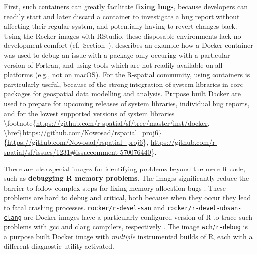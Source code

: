 First, such containers can greatly facilitate \textbf{fixing bugs},
because developers can readily start and later discard a container to
investigate a bug report without affecting their regular system, and
potentially having to revert changes back. Using the Rocker images with
RStudio, these disposable environments lack no development comfort
(cf.~Section~). \citet{eddelbuettel_debugging_2019}
describes an example how a Docker container was used to debug an issue
with a package only occuring with a particular version of Fortran, and
using tools which are not readily available on all platforms (e.g., not
on macOS). For the \href{https://www.r-spatial.org/}{R-spatial
community}, using containers is particularly useful, because of the
strong integration of system libraries in core packages for geospatial
data modelling and analysis. Purpose built Docker are used to prepare
for upcoming releases of system libraries, individual bug reports, and
for the lowest supported versions of system libraries
\textbackslash{}footnote\{\href{https://github.com/r-spatial/sf/tree/master/inst/docker}{https://github.com/r-spatial/sf/tree/master/inst/docker},
\textbackslash{}href\{\url{https://github.com/Nowosad/rspatial_proj6}\}\{\url{https://github.com/Nowosad/rspatial_proj6}\},
\href{https://github.com/r-spatial/sf/issues/1231#issuecomment-570076440}{https://github.com/r-spatial/sf/issues/1231\#issuecomment-570076440}\}.

There are also special images for identifying problems beyond the mere R
code, such as \textbf{debugging R memory problems}. The images
significantly reduce the barrier to follow complex steps for fixing
memory allocation bugs \citep[cf. Section~4.3 in][]{core_writing_1999}.
These problems are hard to debug and critical, both because when they
occur they lead to fatal crashing processes.
\href{https://github.com/rocker-org/r-devel-san}{\texttt{rocker/r-devel-san}}
and
\href{https://github.com/rocker-org/r-devel-san-clang}{\texttt{rocker/r-devel-ubsan-clang}}
are Docker images have a particularly configured version of R to trace
such problems with gcc and clang compilers, respectively
\citep[cf.~ for examples,][]{eddelbuettel_sanitizers_2014}.
The image \href{https://github.com/wch/r-debug}{\texttt{wch/r-debug}} is
a purpose built Docker image with \emph{multiple} instrumented builds of
R, each with a different diagnostic utility activated.

